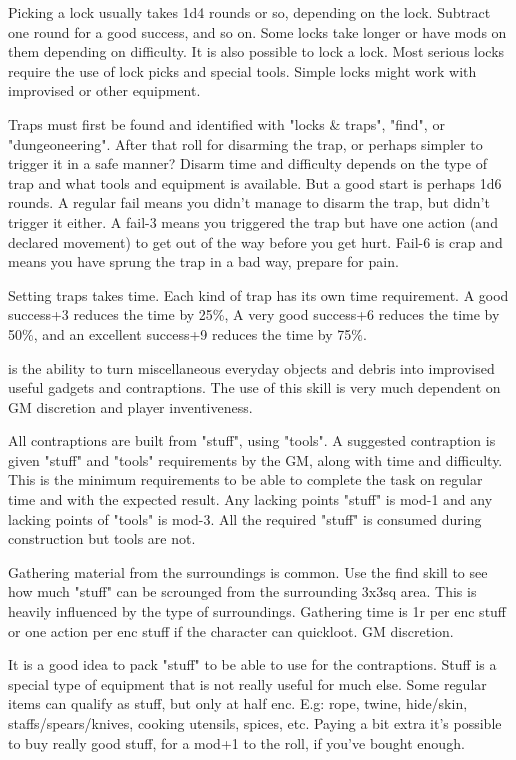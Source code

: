 Picking a lock usually takes 1d4 rounds or so, depending on the lock. Subtract one round for a good success, and so on. Some locks take longer or have mods on them depending on difficulty. It is also possible to lock a lock.
Most serious locks require the use of lock picks and special tools. Simple locks might work with improvised or other equipment.

Traps must first be found and identified with "locks \& traps", "find", or "dungeoneering". After that roll for disarming the trap, or perhaps simpler to trigger it in a safe manner? Disarm time and difficulty depends on the type of trap and what tools and equipment is available. But a good start is perhaps 1d6 rounds.
A regular fail means you didn't manage to disarm the trap, but didn't trigger it either. A fail-3 means you triggered the trap but have one action (and declared movement) to get out of the way before you get hurt. Fail-6 is crap and means you have sprung the trap in a bad way, prepare for pain.

Setting traps takes time. Each kind of trap has its own time requirement. A good success+3 reduces the time by 25\%, A very good success+6 reduces the time by 50\%, and an excellent success+9 reduces the time by 75\%.


 is the ability to turn miscellaneous everyday objects and debris into improvised useful gadgets and contraptions. The use of this skill is very much dependent on GM discretion and player inventiveness.

All contraptions are built from "stuff", using "tools". A suggested contraption is given "stuff" and "tools" requirements by the GM, along with time and difficulty. This is the minimum requirements to be able to complete the task on regular time and with the expected result. Any lacking points "stuff" is mod-1 and any lacking points of "tools" is mod-3.
All the required "stuff" is consumed during construction but tools are not.

Gathering material from the surroundings is common. Use the find skill to see how much "stuff" can be scrounged from the surrounding 3x3sq area. This is heavily influenced by the type of surroundings. Gathering time is 1r per enc stuff or one action per enc stuff if the character can quickloot. GM discretion.

It is a good idea to pack "stuff" to be able to use for the contraptions. Stuff is a special type of equipment that is not really useful for much else. Some regular items can qualify as stuff, but only at half enc. E.g: rope, twine, hide/skin, staffs/spears/knives, cooking utensils, spices, etc. Paying a bit extra it's possible to buy really good stuff, for a mod+1 to the roll, if you've bought enough.

